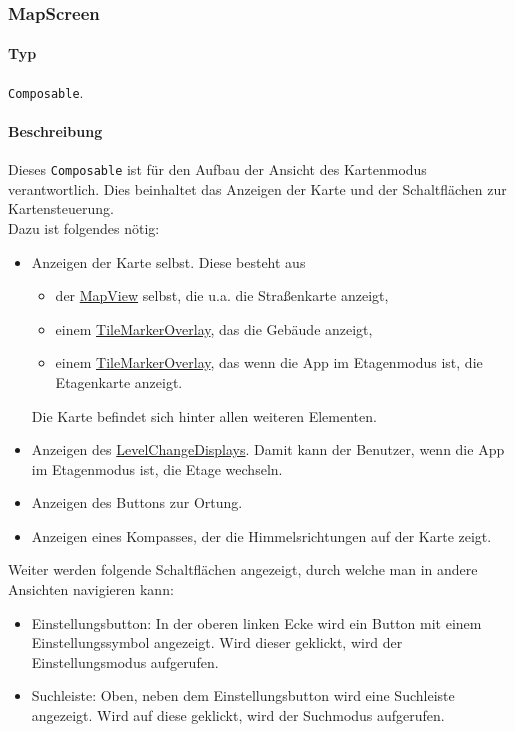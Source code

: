 \subsubsection{MapScreen}\label{App_Map_View_MapScreen}
\paragraph*{Typ}
\texttt{Composable}.
\paragraph*{Beschreibung}
Dieses \texttt{Composable} ist für den Aufbau der Ansicht des Kartenmodus verantwortlich.
Dies beinhaltet das Anzeigen der Karte und der Schaltflächen zur Kartensteuerung.\\
Dazu ist folgendes nötig:
\begin{itemize}
    \item Anzeigen der Karte selbst. Diese besteht aus
        \begin{itemize}
            \item der \href{https://osmdroid.github.io/osmdroid/javadocAll/org/osmdroid/views/MapView.html}
            {MapView} selbst, die u.a. die Straßenkarte anzeigt,
            \item einem \hyperref[App_Map_View_TileMarkerOverlay]{TileMarkerOverlay}, das die Gebäude anzeigt,
            \item einem \hyperref[App_Map_View_TileMarkerOverlay]{TileMarkerOverlay}, das wenn die App im Etagenmodus ist, die Etagenkarte anzeigt.
        \end{itemize}
        Die Karte befindet sich hinter allen weiteren Elementen.
    \item Anzeigen des \hyperref[App_Map_View_LevelChangeDisplay]{LevelChangeDisplays}. Damit kann der Benutzer, wenn die App im Etagenmodus 
    ist, die Etage wechseln.
    \item Anzeigen des Buttons zur Ortung.
    \item Anzeigen eines Kompasses, der die Himmelsrichtungen auf der Karte zeigt.
\end{itemize}
Weiter werden folgende Schaltflächen angezeigt, durch welche man in andere Ansichten navigieren kann:
\begin{itemize}
    \item Einstellungsbutton: In der oberen linken Ecke wird ein Button mit einem Einstellungssymbol angezeigt. 
    Wird dieser geklickt, wird der Einstellungsmodus aufgerufen.
    \item Suchleiste: Oben, neben dem Einstellungsbutton wird eine Suchleiste angezeigt. 
    Wird auf diese geklickt, wird der Suchmodus aufgerufen.
\end{itemize}

